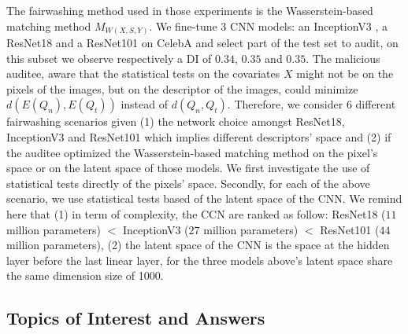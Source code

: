 \documentclass[runningheads, orivec]{llncs}
\begin{document}
The fairwashing method used in those experiments is the Wasserstein-based matching method $M_{W(X,S,Y)}$. We fine-tune 3 CNN models: an InceptionV3 \cite{szegedy2015rethinkinginceptionarchitecturecomputer}, a ResNet18 and a ResNet101 \cite{he2015deepresiduallearningimage} on CelebA and select part of the test set to audit, on this subset we observe respectively a DI of $0.34$, $0.35$ and $0.35$. The malicious auditee, aware that the statistical tests on the covariates $X$ might not be on the pixels of the images, but on the descriptor of the images, could minimize $d(E(Q_n), E(Q_t))$ instead of $d(Q_n, Q_t)$. Therefore, we consider 6 different fairwashing scenarios given (1) the network choice amongst ResNet18, InceptionV3 and ResNet101 which implies different descriptors' space and (2) if the auditee optimized the Wasserstein-based matching method on the pixel's space or on the latent space of those models. We first investigate the use of statistical tests directly of the pixels' space. Secondly, for each of the above scenario, we use statistical tests based of the latent space of the CNN. We remind here that (1) in term of complexity, the CCN are ranked as follow: ResNet18 ($11$ million parameters) $<$ InceptionV3 ($27$ million parameters) $<$ ResNet101 ($44$ million parameters), (2) the latent space of the CNN is the space at the hidden layer before the last linear layer, for the three models above's latent space share the same dimension size of 1000. 

\subsection{Topics of Interest and Answers}
\end{document}
